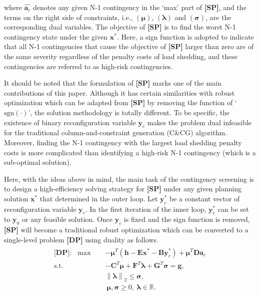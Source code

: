\documentclass[a4paper,fleqn]{cas-dc}
\begin{document}
\noindent where $ \widehat{\boldsymbol{a}_{c}} $ denotes any given N-1 
contingency in the `max' part of \textbf{[SP]}, and the terms on the
right side of constraints, i.e., $ (\boldsymbol{\mu}) $,
$ (\boldsymbol{\lambda}) $ and $ (\boldsymbol{\sigma}) $, are the corresponding
dual variables. The objective of \textbf{[SP]} is to find the worst N-1 
contingency state under the given $ \boldsymbol{x}^{*} $. 
Here, a sign function is adopted to indicate that all N-1 contingencies that 
cause the objective of \textbf{[SP]} larger than zero are of the same severity
regardless of the penalty costs of load shedding, and these contingencies are 
referred to as high-risk contingencies.

It should be noted that the formulation of \textbf{[SP]} marks one of the main
contributions of this paper. Although it has certain similarities with robust 
optimization \cite{Wu_2016_Two-stage} which can be adapted from \textbf{[SP]} 
by removing the function of `$ \mathrm{sgn}(\cdot) $', the solution methodology 
is totally different. To be specific, the existence of binary reconfiguration 
variable $ \boldsymbol{y}_{c} $ makes the problem dual infeasible for 
the traditional column-and-constraint generation (C\&CG) algorithm. Moreover, 
finding the N-1 contingency with the largest load shedding penalty costs is 
more complicated than identifying a high-risk N-1 contingency 
{\color{blue}
(which is a sub-optimal solution).
}

Here, with the ideas above in mind, the main task of the contingency screening
is to design a high-efficiency solving strategy for \textbf{[SP]} 
under any given planning solution $ \boldsymbol{x}^{*} $ that determined in 
the outer loop. Let $ \boldsymbol{y}_{c}^{*} $ be a constant vector of
reconfiguration variable $ \boldsymbol{y}_{c} $. In the first iteration of the 
inner loop, $ \boldsymbol{y}_{c}^{*} $ can be set to $ \boldsymbol{y}_{0} $ or 
any feasible solution. Once $ \boldsymbol{y}_{c} $ is fixed and the sign 
function is removed, \textbf{[SP]} will become a traditional robust 
optimization which can be converted to a single-level problem \textbf{[DP]} 
using duality as follows.
\begin{align}
    \label{DP}
    \begin{aligned}
        \textbf{[DP]}: \ \ \max \quad & 
        -\boldsymbol{\mu}^{T} (\boldsymbol{h} - \boldsymbol{E} 
        \boldsymbol{x}^{*} - \boldsymbol{B} \boldsymbol{y}_{c}^{*}) + 
        \boldsymbol{\mu}^{T} \boldsymbol{D} \boldsymbol{a}_{c} \\ 
        \text{s.t.} \quad & 
        -\boldsymbol{C}^{T} \boldsymbol{\mu} + 
        \boldsymbol{F}^{T} \boldsymbol{\lambda} + 
        \boldsymbol{G}^{T} \boldsymbol{\sigma} = \boldsymbol{g}, \\
        & \left\| \boldsymbol{\lambda} \right\|_{2} \leq \boldsymbol{\sigma}, \\ 
        & \ \boldsymbol{\mu}, \boldsymbol{\sigma} \geq 0, 
        \ \boldsymbol{\lambda} \in \mathbb{R}.
    \end{aligned}
\end{align}
\end{document}
